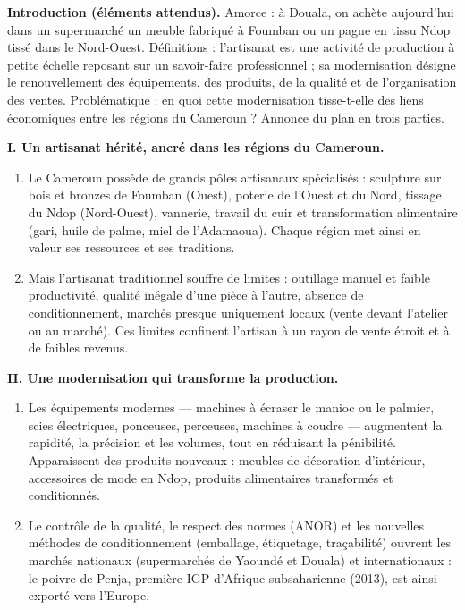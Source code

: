 \documentclass[11pt]{article}
\begin{document}
\begin{corrige}
\textbf{Introduction (éléments attendus).} Amorce : à Douala, on achète aujourd'hui dans un supermarché un meuble fabriqué à Foumban ou un pagne en tissu Ndop tissé dans le Nord-Ouest. Définitions : l'artisanat est une activité de production à petite échelle reposant sur un savoir-faire professionnel ; sa modernisation désigne le renouvellement des équipements, des produits, de la qualité et de l'organisation des ventes. Problématique : en quoi cette modernisation tisse-t-elle des liens économiques entre les régions du Cameroun ? Annonce du plan en trois parties.

\textbf{I. Un artisanat hérité, ancré dans les régions du Cameroun.}
\begin{enumerate}
\item Le Cameroun possède de grands pôles artisanaux spécialisés : sculpture sur bois et bronzes de Foumban (Ouest), poterie de l'Ouest et du Nord, tissage du Ndop (Nord-Ouest), vannerie, travail du cuir et transformation alimentaire (gari, huile de palme, miel de l'Adamaoua). Chaque région met ainsi en valeur ses ressources et ses traditions.
\item Mais l'artisanat traditionnel souffre de limites : outillage manuel et faible productivité, qualité inégale d'une pièce à l'autre, absence de conditionnement, marchés presque uniquement locaux (vente devant l'atelier ou au marché). Ces limites confinent l'artisan à un rayon de vente étroit et à de faibles revenus.
\end{enumerate}

\textbf{II. Une modernisation qui transforme la production.}
\begin{enumerate}
\item Les équipements modernes — machines à écraser le manioc ou le palmier, scies électriques, ponceuses, perceuses, machines à coudre — augmentent la rapidité, la précision et les volumes, tout en réduisant la pénibilité. Apparaissent des produits nouveaux : meubles de décoration d'intérieur, accessoires de mode en Ndop, produits alimentaires transformés et conditionnés.
\item Le contrôle de la qualité, le respect des normes (ANOR) et les nouvelles méthodes de conditionnement (emballage, étiquetage, traçabilité) ouvrent les marchés nationaux (supermarchés de Yaoundé et Douala) et internationaux : le poivre de Penja, première IGP d'Afrique subsaharienne (2013), est ainsi exporté vers l'Europe.
\end{enumerate}


\end{corrige}
\end{document}

